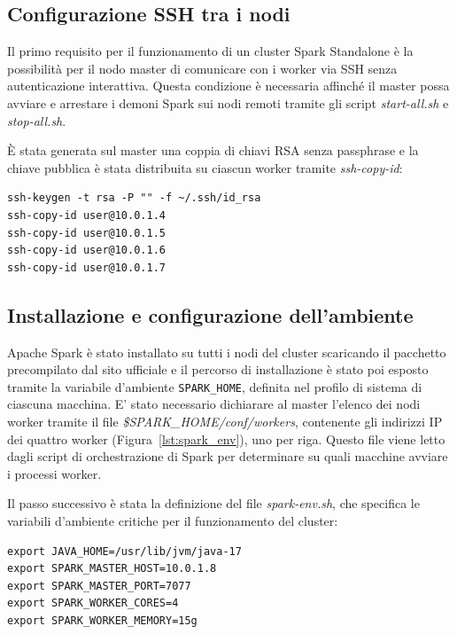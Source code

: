 \documentclass[../main.tex]{subfiles}
\begin{document}
\subsection{Configurazione SSH tra i nodi}

Il primo requisito per il funzionamento di un cluster Spark Standalone 
è la possibilità per il nodo master di comunicare con i worker via SSH 
senza autenticazione interattiva. Questa condizione è necessaria affinché 
il master possa avviare e arrestare i demoni Spark sui nodi remoti tramite 
gli script \textit{start-all.sh} e \textit{stop-all.sh}.

È stata generata sul master una coppia di chiavi RSA senza passphrase e 
la chiave pubblica è stata distribuita su ciascun worker tramite 
\textit{ssh-copy-id}:

\begin{listing}[H]
\begin{verbatim}
ssh-keygen -t rsa -P "" -f ~/.ssh/id_rsa
ssh-copy-id user@10.0.1.4
ssh-copy-id user@10.0.1.5
ssh-copy-id user@10.0.1.6
ssh-copy-id user@10.0.1.7
\end{verbatim}
\caption{Generazione e distribuzione della chiave SSH dal master ai worker.}
\label{lst:ssh_setup}
\end{listing}

\subsection{Installazione e configurazione dell'ambiente}

Apache Spark è stato installato su tutti i nodi del cluster scaricando il pacchetto precompilato dal sito ufficiale e il percorso di installazione è stato poi esposto tramite la variabile d'ambiente \texttt{SPARK\_HOME}, definita nel profilo di sistema di ciascuna macchina. E' stato necessario dichiarare al master l'elenco dei nodi worker tramite il file \textit{\$SPARK\_HOME/conf/workers}, contenente gli indirizzi IP dei quattro worker (Figura~\ref{lst:spark_env}), uno per riga. Questo file viene letto dagli script di orchestrazione di Spark per determinare su quali macchine avviare i processi worker.

Il passo successivo è stata la definizione del file \textit{spark-env.sh}, che specifica le variabili d'ambiente critiche per il funzionamento del cluster:

\begin{listing}[H]
\begin{verbatim}
export JAVA_HOME=/usr/lib/jvm/java-17
export SPARK_MASTER_HOST=10.0.1.8
export SPARK_MASTER_PORT=7077
export SPARK_WORKER_CORES=4
export SPARK_WORKER_MEMORY=15g
\end{verbatim}
\caption{Configurazione delle variabili d'ambiente in \textit{spark-env.sh}.}
\label{lst:spark_env}
\end{listing}
\end{document}
